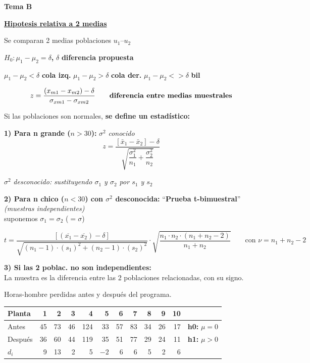 \documentclass[10pt,a4paper]{article}
\begin{document}
{\large\bfseries Tema B\par}
\vspace{2pt}

\textbf{\uline{Hipotesis relativa a 2 medias}}

Se comparan 2 medias poblaciones $u_1$--$u_2$

\textbf{$H_0 : \mu_1 - \mu_2 = \delta$,} \hspace{1.5cm} $\delta$ \textbf{diferencia propuesta}

$\mu_1-\mu_2<\delta$ \textbf{cola izq.} \hspace{0.8cm} $\mu_1-\mu_2>\delta$ \textbf{cola der.} \hspace{0.8cm} $\mu_1-\mu_2<>\delta$ \textbf{bil}

\[
z = \frac{(x_{m1} - x_{m2}) - \delta}{\sigma_{xm1} - \sigma_{xm2}}
\qquad \text{\textbf{diferencia entre medias muestrales}}
\]

Si las poblaciones son normales, \textbf{se define un estadístico:}

\textbf{1) Para n grande ($n>30$):} $\sigma^2$ \textit{conocido}
\[
z = \frac{\left[\bar{x}_1 - \bar{x}_2\right] - \delta}{\sqrt{\dfrac{\sigma_1^2}{n_1} + \dfrac{\sigma_2^2}{n_2}}}
\]
\vspace{-4pt}
{\centering{}\par}

$\sigma^2$ \textit{desconocido:} \textit{sustituyendo $\sigma_1$ y $\sigma_2$ por $s_1$ y $s_2$}

\textbf{2) Para n chico ($n<30$) con $\sigma^2$ desconocida:} ``\textbf{Prueba t-bimuestral}'' \textit{(muestras independientes)} \\
suponemos $\sigma_1 = \sigma_2$ ($=\sigma$)

\[
t = \frac{\left[\left(\overline{x_1} - \overline{x_2}\right) - \delta\right]}{\sqrt{(n_1-1)\cdot(s_1)^2 + (n_2-1)\cdot(s_2)^2}} \cdot \sqrt{\frac{n_1 \cdot n_2 \cdot (n_1+n_2-2)}{n_1+n_2}}
\qquad \text{con } \nu = n_1 + n_2 - 2
\]

\textbf{3) Si las 2 poblac. no son independientes:} \\
La muestra es la diferencia entre las 2 poblaciones relacionadas, con su signo.

\begin{center}
Horas-hombre perdidas antes y después del programa.

\vspace{3pt}
\begin{tabular}{l r r r r r r r r r r l}
\toprule
\rowcolor{gray!12} Planta & 1 & 2 & 3 & 4 & 5 & 6 & 7 & 8 & 9 & 10 & \\
\midrule
Antes    & 45 & 73 & 46 & 124 & 33 & 57 & 83 & 34 & 26 & 17 & \textbf{h0:} $\mu = 0$ \\
Después  & 36 & 60 & 44 & 119 & 35 & 51 & 77 & 29 & 24 & 11 & \textbf{h1:} $\mu > 0$ \\
\rowcolor{gray!12} $d_i$ & 9 & 13 & 2 & 5 & $-2$ & 6 & 6 & 5 & 2 & 6 & \\
\bottomrule
\end{tabular}
\end{center}
\end{document}
